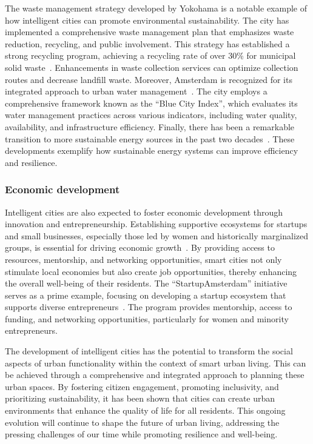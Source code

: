 \documentclass[smartcities,article,submit,pdftex,moreauthors]{Definitions/mdpi}
\begin{document}
The waste management strategy developed by Yokohama is a notable example of how intelligent cities can promote environmental sustainability. The city has implemented a comprehensive waste management plan that emphasizes waste reduction, recycling, and public involvement. This strategy has established a strong recycling program, achieving a recycling rate of over 30\% for municipal solid waste~\cite{WasteManagement1}. Enhancements in waste collection services can optimize collection routes and decrease landfill waste. Moreover, Amsterdam is recognized for its integrated approach to urban water management~\cite{WaterManagement1}. The city employs a comprehensive framework known as the ``Blue City Index'', which evaluates its water management practices across various indicators, including water quality, availability, and infrastructure efficiency. Finally, there has been a remarkable transition to more sustainable energy sources in the past two decades~\cite{SustainableEnegy1,SustainableEnergy2}. These developments exemplify how sustainable energy systems can improve efficiency and resilience.

\subsubsection{Economic development}

Intelligent cities are also expected to foster economic development through innovation and entrepreneurship. Establishing supportive ecosystems for startups and small businesses, especially those led by women and historically marginalized groups, is essential for driving economic growth~\cite{SupportiveEcossystem}. By providing access to resources, mentorship, and networking opportunities, smart cities not only stimulate local economies but also create job opportunities, thereby enhancing the overall well-being of their residents. The ``StartupAmsterdam'' initiative serves as a prime example, focusing on developing a startup ecosystem that supports diverse entrepreneurs~\cite{StartupAmsterdam}. The program provides mentorship, access to funding, and networking opportunities, particularly for women and minority entrepreneurs. 

The development of intelligent cities has the potential to transform the social aspects of urban functionality within the context of smart urban living. This can be achieved through a comprehensive and integrated approach to planning these urban spaces. By fostering citizen engagement, promoting inclusivity, and prioritizing sustainability, it has been shown that cities can create urban environments that enhance the quality of life for all residents. This ongoing evolution will continue to shape the future of urban living, addressing the pressing challenges of our time while promoting resilience and well-being. 
\end{document}
